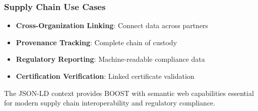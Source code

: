 \subsubsection{Supply Chain Use Cases}

\begin{itemize}
    \item \textbf{Cross-Organization Linking}: Connect data across partners
    \item \textbf{Provenance Tracking}: Complete chain of custody
    \item \textbf{Regulatory Reporting}: Machine-readable compliance data
    \item \textbf{Certification Verification}: Linked certificate validation
\end{itemize}

The JSON-LD context provides BOOST with semantic web capabilities essential for modern supply chain interoperability and regulatory compliance.
